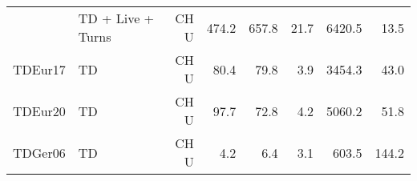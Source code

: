 \begin{tabular}{llrrrrrr}
        & TD + Live + Turns & CH U &            474.2 &            657.8 &      21.7 &                    6420.5 &     13.5 \\
\addlinespace
TDEur17 & TD & CH U &             80.4 &             79.8 &       3.9 &                    3454.3 &     43.0 \\
TDEur20 & TD & CH U &             97.7 &             72.8 &       4.2 &                    5060.2 &     51.8 \\
TDGer06 & TD & CH U &              4.2 &              6.4 &       3.1 &                     603.5 &    144.2 \\
\bottomrule
\end{tabular}

